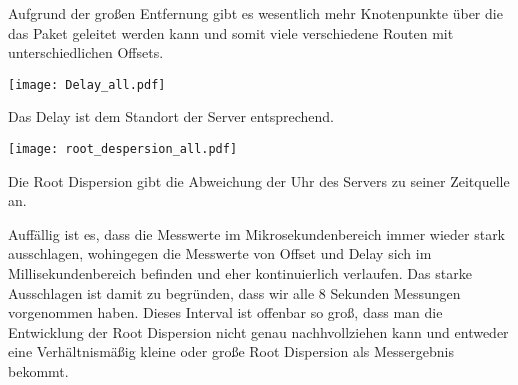\documentclass[a4paper, 11pt, fleqn, notitlepage, egregdoesnotlikesansseriftitles]{scrartcl}
\begin{document}
Aufgrund der großen Entfernung gibt es wesentlich mehr Knotenpunkte über die das Paket geleitet werden kann und somit viele verschiedene Routen mit unterschiedlichen Offsets.

\begin{center}
    \texttt{[image: Delay\_all.pdf]}
    \label{fig:delay}
\end{center}

Das Delay ist dem Standort der Server entsprechend.

\begin{center}
    \texttt{[image: root\_despersion\_all.pdf]}
    \label{fig:disp}
\end{center}

Die Root Dispersion gibt die Abweichung der Uhr des Servers zu seiner Zeitquelle an.

Auffällig ist es, dass die Messwerte im Mikrosekundenbereich immer wieder stark ausschlagen, wohingegen die Messwerte von Offset und Delay sich im Millisekundenbereich befinden und eher kontinuierlich verlaufen. Das starke Ausschlagen ist damit zu begründen, dass wir alle 8 Sekunden Messungen vorgenommen haben. Dieses Interval ist offenbar so groß, dass man die Entwicklung der Root Dispersion nicht genau nachhvollziehen kann und entweder eine Verhältnismäßig kleine oder große Root Dispersion als Messergebnis bekommt.


\end{document}

